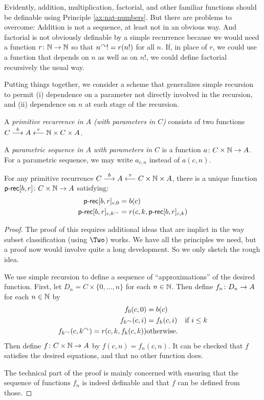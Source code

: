 Evidently, addition, multiplication, factorial, and other familiar functions should be definable using Principle \ref{ax:nat-numbers}. 
But there are problems to overcome: Addition is not a sequence, at least not in an obvious way. And factorial is not obviously definable by a simple recurrence
because we would need a function ${r}\colon{\mathbb N}\to{\mathbb N}$ so that $n^\curvearrowright! = r(n!)$
for all $n$. If, in place of $r$, we could use a function that depends on $n$ as well as on $n!$, we could define factorial recursively the usual way.

Putting things together, we consider a scheme that generalizes simple recursion to permit (i) dependence on a parameter not directly involved in the recursion, and
(ii) dependence on $n$ at each stage of the recursion.

\begin{defn}
	A \emph{primitive recurrence in $A$ (with parameters in $C$)} consists of two  functions $C\stackrel{b}{\longrightarrow} A\stackrel{r}{\longleftarrow}\mathbb N\times C\times A$.
	
	A \emph{parametric sequence in $A$ with parameters in $C$} is a function
	${a}\colon{C\times \mathbb N}\to{A}$. For a parametric sequence, we may write $a_{c,n}$
	instead of $a(c,n)$. 
\end{defn}

\begin{theorem}
	For any primitive recurrence $C \stackrel{b}{\longrightarrow} A \stackrel{r}{\longleftarrow} C\times \mathbb N \times A$, there is a unique
	function ${\mathord{\textsf{p-rec}}[b,r]}\colon{C\times \mathbb N}\to{A}$ satisfying: 
	\begin{align*}
		\mathord{\textsf{p-rec}}[b,r]_{c,0} &= b(c)\\
		\mathord{\textsf{p-rec}}[b,r]_{c,k^\curvearrowright} &= r(c,k,\mathord{\textsf{p-rec}}[b,r]_{c,k})
	\end{align*}

	\begin{proof}
		The proof of this requires additional ideas that are implict in the way subset classification (using $\Two$) works. We have all the principles we need, but a proof now would involve quite a long development. So we only sketch the rough idea.
		
		We use simple recursion to define a sequence of ``approximations'' of the desired function. First, let $D_n = C\times \{0,\dotsc,n\}$ for each $n\in\mathbb N$. Then define 
		${f_n}\colon{D_n}\to{A}$ for each $n\in \mathbb N$ by
		\begin{align*}
			f_0(c,0) &= b(c)\\
			f_{k^\curvearrowright}(c,i) &= f_k(c,i) & \text{if $i\leq k$}\\
			f_{k^\curvearrowright}(c,k^\curvearrowright) = 	r(c,k,f_k(c,k)) & \text{otherwise}.
		\end{align*}
		Then define ${f}\colon{C\times \mathbb N}\to{A}$ by $f(c,n) = f_n(c,n)$. 
		It can be checked that $f$ satisfies the desired equations, and that no other function does.
		
		The technical part of the proof is mainly concerned with ensuring that the sequence of functions $f_n$ is indeed definable and that $f$ can be defined from those.  
	\end{proof}
\end{theorem}

